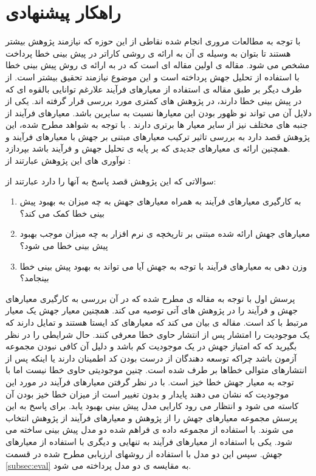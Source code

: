 \section{راهکار پیشنهادی}
\label{sec:method}
با توجه به مطالعات مروری انجام شده نقاطی از این حوزه که نیازمند پژوهش بیشتر هستند تا بتوان به وسیله ی آن به ارائه ی روشی کاراتر در پیش بینی خطا پرداخت مشخص می شود. مقاله ی \cite{bowes2016mutation} اولین مقاله ای است که در به ارائه ی روش پیش بینی خطا با استفاده از تحلیل جهش پرداخته است و این موضوع نیازمند تحقیق بیشتر است. از طرف دیگر بر طبق مقاله ی \cite{radjenovic2013software} استفاده از معیارهای فرآیند علارغم توانایی بالقوه ای که در پیش بینی خطا دارند، در پژوهش های کمتری مورد بررسی قرار گرفته اند. یکی از دلایل آن می تواند نو ظهور بودن این معیارها نسبت به سایرین باشد. معیارهای فرآیند از جنبه های مختلف نیز از سایر معیار ها برتری دارند \cite{rahman2013and}. با توجه به شواهد مطرح شده، این پژوهش قصد دارد به بررسی تاثیر ترکیب معیارهای مبتنی بر جهش با معیارهای فرآیند و همچنین ارائه ی معیارهای جدیدی که بر پایه ی تحلیل جهش و فرآیند باشد بپردازد.\\
نوآوری های این پژوهش عبارتند از :

 سوالاتی که این پژوهش قصد پاسخ به آنها را دارد عبارتند از:

\begin{enumerate}
	\item  
	به کارگیری معیارهای فرآیند به همراه معیارهای جهش به چه میزان به بهبود پیش بینی خطا کمک می کند؟
	\item 
	معیارهای جهش ارائه شده مبتنی بر تاریخچه ی نرم افزار به چه میزان موجب بهبود پیش بینی خطا می شود؟
	\item 
	وزن دهی به معیارهای فرآیند با توجه به جهش آیا می تواند به بهبود پیش بینی خطا بینجامد؟  
\end{enumerate}

پرسش اول با توجه به مقاله ی \cite{bowes2016mutation} مطرح شده که در آن بررسی به کارگیری معیارهای جهش و فرآیند را در پژوهش های آتی توصیه می کند.  همچنین  معیار جهش یک معیار  مرتبط با کد است. مقاله ی \cite{rahman2013and}  بیان می کند که معیارهای کد ایستا هستند و تمایل دارند که یک موجودیت را امتشار پس از انتشار حاوی خطا معرفی کنند. حال شرایطی را در نظر بگیرید که که امتیاز جهش در یک موجودیت کم باشد و دلیل آن کافی نبودن مجموعه آزمون باشد چراکه توسعه دهندگان از درست بودن کد اطمینان دارند یا اینکه پس از انتشارهای متوالی خطاها بر طرف شده است. چنین موجودیتی حاوی خطا نیست اما با توجه به معیار جهش خطا خیز است. با در نظر گرفتن معیارهای فرآیند در مورد این موجودیت که نشان می دهند پایدار و بدون تغییر است از میزان خطا خیز بودن آن کاسته می شود و انتظار می رود کارایی مدل پیش بینی بهبود یابد. 
برای پاسخ به این پرسش مجموعه معیارهای جهش را از پژوهش \cite{bowes2016mutation}  و معیارهای فرآیند از پژوهش \cite{rahman2013and} انتخاب می شوند. با استفاده از مجموعه داده ی فراهم شده دو مدل پیش بینی ساخته می شود. یکی با استفاده از معیارهای فرآیند به تنهایی و دیگری با استفاده از معیارهای جهش. سپس این دو مدل با استفاده از روشهای ارزیابی مطرح شده در قسمت \ref{subsec:eval}  به مقایسه ی دو مدل پرداخته می شود. \\

